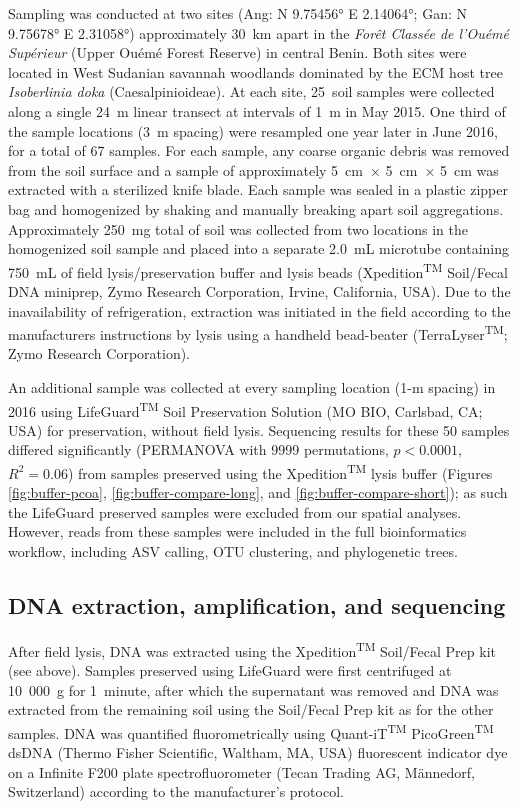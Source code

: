 \documentclass[
]{article}
\begin{document}
Sampling was conducted at two sites (Ang: N 9.75456° E 2.14064°; Gan: N 9.75678° E 2.31058°) approximately 30~km apart in the \emph{Forêt Classée de l'Ouémé Supérieur} (Upper Ouémé Forest Reserve) in central Benin.
Both sites were located in West Sudanian savannah woodlands \autocite{olson2001,yorou2014} dominated by the ECM host tree \emph{Isoberlinia doka} (Caesalpinioideae).
At each site, 25~soil samples were collected along a single 24~m linear transect at intervals of 1~m in May 2015.
One third of the sample locations (3~m spacing) were resampled one year later in June 2016, for a total of 67 samples.
For each sample, any coarse organic debris was removed from the soil surface and a sample of approximately 5~cm~× 5~cm~× 5~cm was extracted with a sterilized knife blade.
Each sample was sealed in a plastic zipper bag and homogenized by shaking and manually breaking apart soil aggregations.
Approximately 250~mg total of soil was collected from two locations in the homogenized soil sample and placed into a separate 2.0~mL microtube containing 750~mL of field lysis/preservation buffer and lysis beads (Xpedition\textsuperscript{TM} Soil/Fecal DNA miniprep, Zymo Research Corporation, Irvine, California, USA).
Due to the inavailability of refrigeration, extraction was initiated in the field according to the manufacturers instructions by lysis using a handheld bead-beater (TerraLyser\textsuperscript{TM}; Zymo Research Corporation).

An additional sample was collected at every sampling location (1-m spacing) in 2016 using LifeGuard\textsuperscript{TM} Soil Preservation Solution (MO BIO, Carlsbad, CA; USA) for preservation, without field lysis.
Sequencing results for these 50 samples differed significantly (PERMANOVA with 9999 permutations, \(p < 0.0001\), \(R^2 = 0.06\)) from samples preserved using the Xpedition\textsuperscript{TM} lysis buffer (Figures \ref{fig:buffer-pcoa}, \ref{fig:buffer-compare-long}, and \ref{fig:buffer-compare-short}); as such the LifeGuard preserved samples were excluded from our spatial analyses.
However, reads from these samples were included in the full bioinformatics workflow, including ASV calling, OTU clustering, and phylogenetic trees.

\hypertarget{DNA-supplement}{%
\subsection{DNA extraction, amplification, and sequencing}\label{DNA-supplement}}

After field lysis, DNA was extracted using the Xpedition\textsuperscript{TM} Soil/Fecal Prep kit (see above).
Samples preserved using LifeGuard were first centrifuged at 10~000~g for 1~minute, after which the supernatant was removed and DNA was extracted from the remaining soil using the Soil/Fecal Prep kit as for the other samples.
DNA was quantified fluorometrically using Quant-iT\textsuperscript{TM} PicoGreen\textsuperscript{TM} dsDNA (Thermo Fisher Scientific, Waltham, MA, USA) fluorescent indicator dye on a Infinite F200 plate spectrofluorometer (Tecan Trading AG, Männedorf, Switzerland) according to the manufacturer's protocol.
\end{document}
